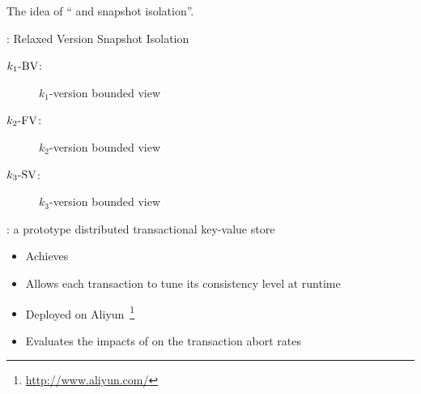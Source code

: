 \begin{frame}{}
  The idea of {\large `` and  snapshot isolation''}.

  \vspace{0.50cm}
  \red{\rvsi{}}: Relaxed Version Snapshot Isolation
  \begin{description}
    \item[$k_1\text{-BV}$:] $k_1$-version bounded \emph{} view
    \item[$k_2\text{-FV}$:] $k_2$-version bounded \emph{} view
    \item[$k_3\text{-SV}$:] $k_3$-version bounded \emph{} view
  \end{description}

  \pause
  \vspace{10pt}
  \blue{\chameleon{}}: a prototype distributed transactional key-value store
  \begin{itemize}
    \item Achieves \rvsi{}
    \item Allows each transaction to tune its consistency level at runtime
      \pause
    \item Deployed on Aliyun~\footnote{\url{http://www.aliyun.com/}}
    \item Evaluates the impacts of \rvsi{} on the transaction abort rates
  \end{itemize}
\end{frame}
